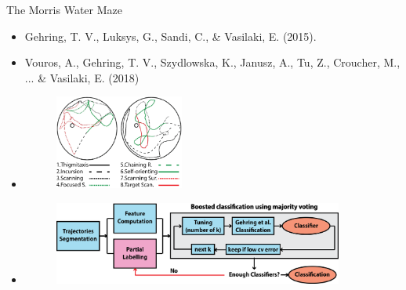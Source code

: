 \documentclass{beamer}
\begin{document}
{\begin{frame}{The Morris Water Maze}
\begin{multicols}{2}
	\begin{itemize}[leftmargin=*]	
		\item<1->
			\vspace*{5mm}	
			\small{Gehring, T. V., Luksys, G., Sandi, C., \& Vasilaki, E. (2015).}
		\item<2->
			\vspace*{4mm}	
			\small{Vouros, A., Gehring, T. V., Szydlowska, K., Janusz, A., Tu, Z., Croucher, M., ... \& Vasilaki, E. (2018)}	
		\item<1->			
			\begin{figure}[H]
				\centering
				\includegraphics[width=0.40\textwidth]{figures/gehringetal}
			\end{figure}	
	\end{itemize}			
\end{multicols}		
\vspace{6mm}	
\begin{itemize}[leftmargin=*]
	\item<2->
	\begin{figure}[H]
		\centering
		\includegraphics[width=0.90\textwidth]{figures/vourosetal}
	\end{figure}		
\end{itemize}	
\end{frame}


}
\end{document}

